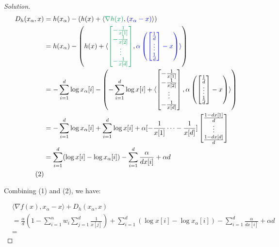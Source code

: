 \documentclass{article}
\newenvironment{solution}
  {\renewcommand\qedsymbol{$\blacksquare$}\begin{proof}[Solution]}
  {\end{proof}}
\begin{document}
\begin{solution}
\begin{align*}
    D_h(x_\alpha, x) 
    &= h(x_\alpha) - \left(h(x) + \langle \textcolor{Green}{\nabla h(x)}, \textcolor{blue}{(x_\alpha - x)} \rangle \right) \\
    &= h(x_\alpha) - \left(h(x) + \langle
        \textcolor{Green}{\begin{bmatrix}
        -\frac{1}{x[1]} \\
        -\frac{1}{x[2]} \\
        \vdots \\
        -\frac{1}{x[d]}
        \end{bmatrix}}, 
    \textcolor{blue}{\alpha \left( \begin{bmatrix}
    \frac{1}{d} \\
    \vdots \\
    \frac{1}{d} \end{bmatrix} - x \right) \rangle} \right) \\
    &= -\sum_{i=1}^d \log x_\alpha[i] - \left( -\sum_{i=1}^d \log x[i] + \langle 
    \begin{bmatrix}
        -\frac{1}{x[1]} \\
        -\frac{1}{x[2]} \\
        \vdots \\
        -\frac{1}{x[d]}
    \end{bmatrix}, \alpha \left( \begin{bmatrix}
        \frac{1}{d} \\
        \vdots \\
        \frac{1}{d}
    \end{bmatrix} - x \right) \rangle \right) \\
    &= -\sum_{i=1}^d \log x_\alpha[i] + \sum_{i=1}^d \log x[i] + \alpha [-\frac{1}{x[1]} \cdots -\frac{1}{x[d]}]
    \begin{bmatrix}
        \frac{1 - dx[1]}{d} \\
        \vdots \\
        \frac{1 - dx[d]}{d}
    \end{bmatrix} \\
    &= \sum_{i = 1}^d (\log x[i] - \log x_\alpha[i]) - \sum_{i = 1}^d \frac{\alpha}{d x[i]} + \alpha d \\
    \tag{2}
\end{align*}

Combining (1) and (2), we have:

\begin{align*}
    &\langle \nabla f(x), x_\alpha - x \rangle + D_h(x_\alpha, x) \\
    &= \frac{\alpha}{d} \left( 1 - \sum_{i = 1}^n w_i \sum_{j = 1}^d \frac{1}{x[j]} \right)
        + \sum_{i = 1}^d (\log x[i] - \log x_\alpha[i]) - \sum_{i = 1}^d \frac{\alpha}{d x[i]} + \alpha d \\
    &= 
\end{align*}






\end{solution}
\end{document}
